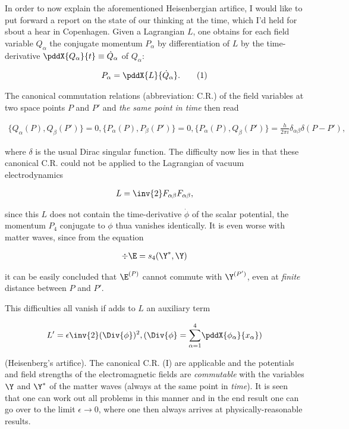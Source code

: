 \documentclass{article}
\newcommand{\nequ}[2]{
\begin{align*}
#1
\tag{#2}
\end{align*}
}
\newcommand{\uequ}[1]{
\begin{align*}
#1
\end{align*}
}
\newcommand{\sumXY}[2]{\underset{#1}{\overset{#2}{\sum}}}
\begin{document}
In order to now explain the aforementioned Heisenbergian artifice, I would like to put forward a report on the state of our thinking at the time, which I'd held for sbout a hear in Copenhagen. Given a Lagrangian $L$, one obtains for each field variable $Q_\alpha$ the conjugate momentum $P_\alpha$ by differentiation of $L$ by the time-derivative $\pddX{Q_\alpha}{t} \equiv \dot{Q}_\alpha$ of $Q_\alpha$:
\nequ{
P_\alpha = \pddX{L}{\dot{Q}_\alpha}.
}{1}

The canonical commutation relations (abbreviation: C.R.) of the field variables at two space points $P$ and $P'$ and \textit{the same point in time} then read
\nequ{
\{Q_\alpha(P), Q_\beta(P')\}=0,
\{P_\alpha(P), P_\beta(P')\}=0,
\{P_\alpha(P), Q_\beta(P')\}=\frac{h}{2\pi i}\delta_{\alpha\beta}\delta(P-P'),
}{I}
where $\delta$ is the usual Dirac singular function. The difficulty now lies in that these canonical C.R. could not be applied to the Lagrangian of vacuum electrodynamics
\uequ{
L=\inv{2}F_{\alpha\beta}F_{\alpha\beta},
}
since this $L$ does not contain the time-derivative $\dot{\phi}$ of the scalar potential, the momentum $P_4$ conjugate to $\phi$ thua vanishes identically. It is even worse with matter waves, since from the equation
\uequ{
\div{\E} = s_4(\Y^*,\Y)
}
it can be easily concluded that $\E^{(P)}$ cannot commute with $\Y^{(P')}$, even at \textit{finite} distance between $P$ and $P'$.

This difficulties all vanish if adds to $L$ an auxiliary term
\uequ{
L'=\epsilon \inv{2}(\Div{\phi})^2,
(\Div{\phi} = \sumXY{\alpha=1}{4}\pddX{\phi_\alpha}{x_\alpha})
}
(Heisenberg's artifice). The canonical C.R. (I) are applicable and the potentials and field strengths of the electromagnetic fields are \textit{commutable} with the variables $\Y$ and $\Y^*$ of the matter waves (always at the same point in \textit{time}). It is seen that one can work out all problems in this manner and in the end result one can go over to the limit $\epsilon \to 0$, where one then always arrives at physically-reasonable results.
\end{document}
